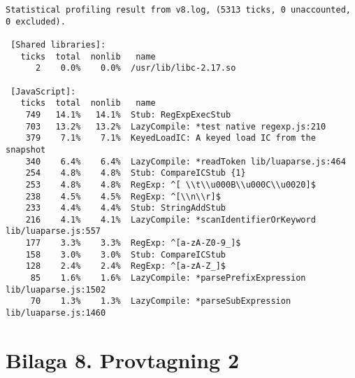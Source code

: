 \footnotesize
\begin{verbatim}
Statistical profiling result from v8.log, (5313 ticks, 0 unaccounted, 0 excluded).

 [Shared libraries]:
   ticks  total  nonlib   name
      2    0.0%    0.0%  /usr/lib/libc-2.17.so

 [JavaScript]:
   ticks  total  nonlib   name
    749   14.1%   14.1%  Stub: RegExpExecStub
    703   13.2%   13.2%  LazyCompile: *test native regexp.js:210
    379    7.1%    7.1%  KeyedLoadIC: A keyed load IC from the snapshot
    340    6.4%    6.4%  LazyCompile: *readToken lib/luaparse.js:464
    254    4.8%    4.8%  Stub: CompareICStub {1}
    253    4.8%    4.8%  RegExp: ^[ \\t\\u000B\\u000C\\u0020]$
    238    4.5%    4.5%  RegExp: ^[\\n\\r]$
    233    4.4%    4.4%  Stub: StringAddStub
    216    4.1%    4.1%  LazyCompile: *scanIdentifierOrKeyword lib/luaparse.js:557
    177    3.3%    3.3%  RegExp: ^[a-zA-Z0-9_]$
    158    3.0%    3.0%  Stub: CompareICStub
    128    2.4%    2.4%  RegExp: ^[a-zA-Z_]$
     85    1.6%    1.6%  LazyCompile: *parsePrefixExpression lib/luaparse.js:1502
     70    1.3%    1.3%  LazyCompile: *parseSubExpression lib/luaparse.js:1460
\end{verbatim}

\clearpage
{}
\section*{Bilaga 8. Provtagning 2}

